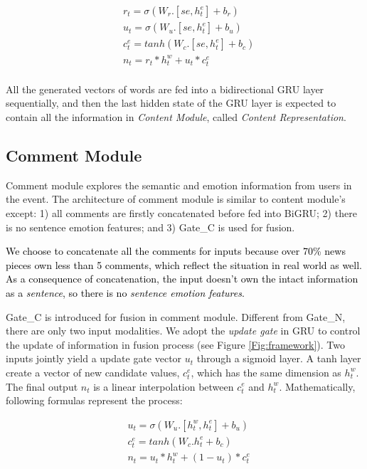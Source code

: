 \documentclass[conference]{IEEEtran}
\newcommand{\kai}[1]{\textcolor{blue}{Kai: {#1}}}
\newcommand{\new}[1]{\textcolor{black}{{#1}}}
\begin{document}
	\begin{equation}
	\begin{aligned}
	&r_t = \sigma(W_r.[se, h^e_t] + b_r)\\
	&u_t = \sigma(W_u.[se, h^e_t] + b_u)\\
	&c_t^e = tanh(W_c.[se, h^e_t] + b_c)\\
	&n_t = r_t * h^w_t + u_t * c_t^e\\
	\end{aligned}
	\end{equation}
	
	All the generated vectors of words are fed into a bidirectional GRU layer sequentially, and then the last hidden state of the GRU layer is expected to contain all the information in {\em Content Module}, called {\em Content Representation}.
	
	\subsection{Comment Module}
	Comment module explores the semantic and emotion information from users in the event. The architecture of comment module is similar to content module's except: 1) all comments are firstly concatenated before fed into BiGRU; 2) there is no sentence emotion features; and 3) Gate\_C is used for fusion.
	
	\new{We choose to concatenate all the comments for inputs because over 70\% news pieces own less than 5 comments, which reflect the situation in real world as well. As a consequence of concatenation, the input doesn't own the intact information as a {\em sentence}, so there is no {\em sentence emotion features}.}
	
	Gate\_C is introduced for fusion in comment module. Different from Gate\_N, there are only two input modalities. We adopt the \textit{update gate} in GRU to control the update of information in fusion process (see Figure \ref{Fig:framework}). Two inputs jointly yield a update gate vector $u_t$ through a sigmoid layer. A tanh layer create a vector of new candidate values, $c_t^e$, which has the same dimension as $h^w_t$. The final output $n_t$ is a linear interpolation between $c_t^e$ and $h_t^w$. Mathematically, following formulas represent the process:
	
	\begin{equation}
	\begin{aligned}
	&u_t = \sigma(W_u.[h^w_t, h^e_t] + b_u)\\
	&c_t^e = tanh(W_c.h^e_t + b_c)\\
	&n_t = u_t*h^w_t + (1-u_t)*c_t^e\\
	\end{aligned}
	\end{equation}
	
\end{document}
